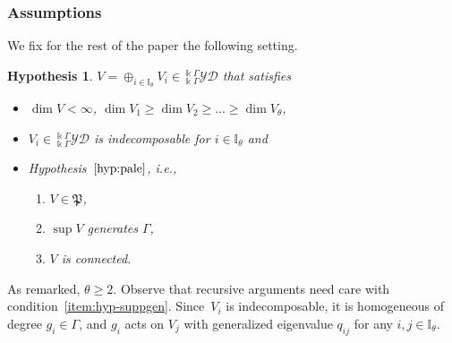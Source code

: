 \documentclass[10pt,a4paper]{amsart}
\numberwithin{equation}{section}
\newtheorem{hypothesis}[Theorem]{Hypothesis}
\newcommand{\pale}{\mathfrak{P}}
\newcommand{\I}{{\mathbb I}}
\newcommand{\yd}[1]{{}_{#1}^{#1}\mathcal{YD}}
\begin{document}
\subsubsection{Assumptions} We fix for the rest of the paper the following setting.
\begin{hypothesis}\label{hypo:recargada}
$V = \oplus_{i \in \I_\theta} V_i\in \yd{\Bbbk\Gamma}$
that satisfies
\begin{itemize}\itemsep=0pt
\item $\dim V < \infty$, $\dim V_1 \geq \dim V_2 \geq \dots \geq \dim V_{\theta}$,

\item $V_i \in \yd{\Bbbk \Gamma}$ is indecomposable for $i\in \I_{\theta}$ and

\item Hypothesis~$\ref{hyp:pale}$, i.e.,
\begin{enumerate}[label=\rm{(\Roman*)}]
\item $V \in \pale$,
\item $\sup V$ generates $\Gamma$,
\item $V$ is connected.
\end{enumerate}
\end{itemize}
\end{hypothesis}

As remarked, $\theta \geq 2$.
Observe that recursive arguments need care with condition~\ref{item:hyp-suppgen}.
Since~$V_i$ is indecomposable, it is homogeneous of degree $g_i \in \Gamma$, and $g_i$ acts on $V_j$ with generalized eigenvalue $q_{ij}$
for any $i,j\in \I_{\theta}$.
\end{document}

